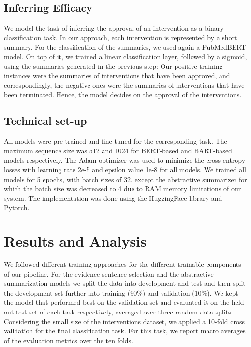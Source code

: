 \documentclass[11pt]{article}
\begin{document}
\subsection{Inferring Efficacy}
We model the task of inferring the approval of an intervention as a binary classification task. In our approach, each intervention is represented by a short summary. For the classification of the summaries, we used again a PubMedBERT model. On top of it, we trained a linear classification layer, followed by a sigmoid, using the summaries generated in the previous step: Our positive training instances were the summaries of interventions that have been approved, and correspondingly, the negative ones were the summaries of interventions that have been terminated. Hence, the model decides on the approval of the interventions.  

\subsection{Technical set-up}
All models were pre-trained and fine-tuned for the corresponding task. The maximum sequence size was 512 and 1024 for BERT-based and BART-based models respectively. The Adam optimizer \cite{kingma2014adam} was used to minimize the cross-entropy losses with learning rate 2e-5 and epsilon value 1e-8 for all models. We trained all models for 5 epochs, with batch sizes of 32, except the abstractive summarizer for which the batch size was decreased to 4 due to RAM memory limitations of our system. The implementation was done using the HuggingFace library \cite{wolf2020transformers} and Pytorch\cite{NEURIPS2019_9015}.


\section{Results and Analysis}
We followed different training approaches for the different trainable components of our pipeline. For the evidence sentence selection and the abstractive summarization models we split the data into development and test and then split the development set further into training (90\%) and validation (10\%). We kept the model  that performed best on the validation set and evaluated it on the held-out test set of each task respectively, averaged over three random data splits. Considering the small size of the interventions dataset, we applied a 10-fold cross validation for the final classification task. For this task, we report macro averages of the evaluation metrics over the ten folds.
\end{document}
